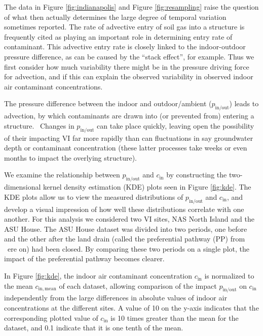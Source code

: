 \documentclass[journal=esthag,manuscript=article]{achemso}
\begin{document}
The data in Figure \ref{fig:indianapolis} and Figure \ref{fig:resampling} raise the question of what then actually determines the large degree of temporal variation sometimes reported.
The rate of advective entry of soil gas into a structure is frequently cited as playing an important role in determining entry rate of contaminant.
This advective entry rate is closely linked to the indoor-outdoor pressure difference, as can be caused by the “stack effect”, for example.
Thus we first consider how much variability there might be in the pressure driving force for advection, and if this can explain the observed variability in observed indoor air contaminant concentrations.\par

The pressure difference between the indoor and outdoor/ambient ($p_\mathrm{in/out}$) leads to advection, by which contaminants are drawn into (or prevented from) entering a structure. 
Changes in $p_\mathrm{in/out}$ can take place quickly, leaving open the possibility of their impacting VI far more rapidly than can fluctuations in say groundwater depth or contaminant concentration (these latter processes take weeks or even months to impact the overlying structure).\par

We examine the relationship between $p_\mathrm{in/out}$ and $c_\mathrm{in}$ by constructing the two-dimensional kernel density estimation (KDE) plots seen in Figure \ref{fig:kde}.
The KDE plots allow us to view the measured distributions of $p_\mathrm{in/out}$ and $c_\mathrm{in}$, and develop a visual impression of how well these distributions correlate with one another.
For this analysis we considered two VI sites, NAS North Island and the ASU House.
The ASU House dataset was divided into two periods, one before and the other after the land drain (called the preferential pathway (PP) from  ere on) had been closed.
By comparing these two periods on a single plot, the impact of the preferential pathway becomes clearer.\par

In Figure \ref{fig:kde}, the indoor air contaminant concentration $c_\mathrm{in}$ is normalized to the mean $c_\mathrm{in,mean}$ of each dataset, allowing comparison of the impact $p_\mathrm{in/out}$ on $c_\mathrm{in}$ independently from the large differences in absolute values of indoor air concentrations at the different sites.
A value of 10 on the y-axis indicates that the corresponding plotted value of $c_\mathrm{in}$ is 10 times greater than the mean for the dataset, and 0.1 indicate that it is one tenth of the mean.\par
\end{document}

